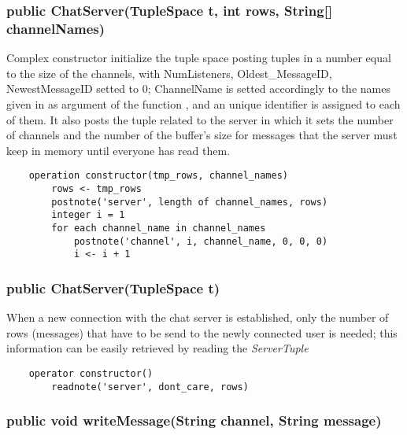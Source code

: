 \documentclass[10pt,a4paper]{article}
\begin{document}
\subsubsection{public ChatServer(TupleSpace t, int rows, String[] channelNames)}

Complex constructor initialize the tuple space posting tuples in a number equal to the size of the channels, with NumListeners, Oldest\_MessageID, NewestMessageID setted to 0; ChannelName is setted accordingly to the names given in as argument of the function , and an unique identifier is assigned to each of them.
It also posts the tuple related to the server in which it sets the number of channels and the number of the buffer's size for messages that the server must keep in memory until everyone has read them.

\begin{verbatim}
	operation constructor(tmp_rows, channel_names)
		rows <- tmp_rows
		postnote('server', length of channel_names, rows)
		integer i = 1
		for each channel_name in channel_names
			postnote('channel', i, channel_name, 0, 0, 0)
			i <- i + 1
\end{verbatim}

\subsubsection{public ChatServer(TupleSpace t)}

When a new connection with the chat server is established, only the number of rows (messages) that have to be send to the newly connected user is needed; this information can be easily retrieved by reading the \textit{ServerTuple} 

\begin{verbatim}
	operator constructor()
		readnote('server', dont_care, rows)
\end{verbatim}

\subsubsection{public void writeMessage(String channel, String message)}
\end{document}

